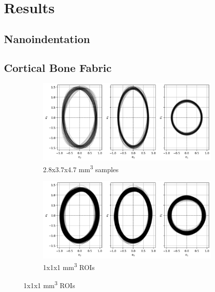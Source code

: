 \documentclass[a4paper,fleqn]{DC_ArtStyle}
\begin{document}

	\clearpage
	\section{Results}
	\subsection{Nanoindentation}
	\begin{table}
		\caption{Nanoindentation - cortical bone matrix properties}
	\end{table}

	\subsection{Cortical Bone Fabric}
	\begin{figure}
		\begin{subfigure}[b]{\linewidth}
			\includegraphics[width=\linewidth]{SamplesFabric}
			\caption{2.8x3.7x4.7 mm\textsuperscript{3} samples}
		\end{subfigure}
		\begin{subfigure}[b]{\linewidth}
			\includegraphics[width=\linewidth]{ROIsFabric}
			\caption{1x1x1 mm\textsuperscript{3} ROIs}
		\end{subfigure}
	\end{figure}
	
\end{document}
